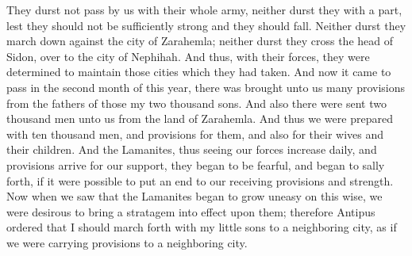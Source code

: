 They durst not pass by us with their whole army, neither durst they with a part, lest they should not be sufficiently strong and they should fall.
\bverse \iffalse Neither durst they march down against the city of Zarahemla; neither durst they cross the head of Sidon, over to the city of Nephihah. \fi
Neither durst they march down against the city of Zarahemla; neither durst they cross the head of Sidon, over to the city of Nephihah.
\bverse \iffalse And thus, with their forces, they were determined to maintain those cities which they had taken. \fi
And thus, with their forces, they were determined to maintain those cities which they had taken.
\bverse \iffalse And now it came to pass in the second month of this year, there was brought unto us many provisions from the fathers of those my two thousand sons. \fi
And now it came to pass in the second month of this year, there was brought unto us many provisions from the fathers of those my two thousand sons.
\bverse \iffalse And also there were sent two thousand men unto us from the land of Zarahemla. And thus we were prepared with ten thousand men, and provisions for them, and also for their wives and their children. \fi
And also there were sent two thousand men unto us from the land of Zarahemla. And thus we were prepared with ten thousand men, and provisions for them, and also for their wives and their children.
\bverse \iffalse And the Lamanites, thus seeing our forces increase daily, and provisions arrive for our support, they began to be fearful, and began to sally forth, if it were possible to put an end to our receiving provisions and strength. \fi
And the Lamanites, thus seeing our forces increase daily, and provisions arrive for our support, they began to be fearful, and began to sally forth, if it were possible to put an end to our receiving provisions and strength.
\bverse \iffalse Now when we saw that the Lamanites began to grow uneasy on this wise, we were desirous to bring a stratagem into effect upon them; therefore Antipus ordered that I should march forth with my little sons to a neighboring city, as if we were carrying provisions to a neighboring city. \fi
Now when we saw that the Lamanites began to grow uneasy on this wise, we were desirous to bring a stratagem into effect upon them; therefore Antipus ordered that I should march forth with my little sons to a neighboring city, as if we were carrying provisions to a neighboring city.
\bverse \iffalse And we were to march near the city of Antiparah, as if we were going to the city beyond, in the borders by the seashore. \fi
